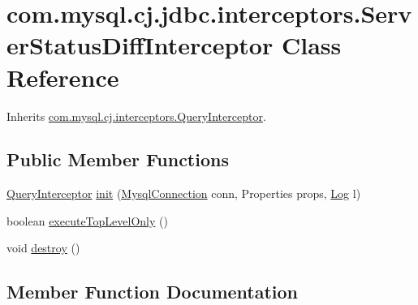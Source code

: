\hypertarget{classcom_1_1mysql_1_1cj_1_1jdbc_1_1interceptors_1_1_server_status_diff_interceptor}{}\section{com.\+mysql.\+cj.\+jdbc.\+interceptors.\+Server\+Status\+Diff\+Interceptor Class Reference}
\label{classcom_1_1mysql_1_1cj_1_1jdbc_1_1interceptors_1_1_server_status_diff_interceptor}


Inherits \mbox{\hyperlink{interfacecom_1_1mysql_1_1cj_1_1interceptors_1_1_query_interceptor}{com.\+mysql.\+cj.\+interceptors.\+Query\+Interceptor}}.

\subsection*{Public Member Functions}
\begin{DoxyCompactItemize}
\item 
\mbox{\hyperlink{interfacecom_1_1mysql_1_1cj_1_1interceptors_1_1_query_interceptor}{Query\+Interceptor}} \mbox{\hyperlink{classcom_1_1mysql_1_1cj_1_1jdbc_1_1interceptors_1_1_server_status_diff_interceptor_a918b0b784bd4d6edb689aa1cf01afb66}{init}} (\mbox{\hyperlink{interfacecom_1_1mysql_1_1cj_1_1_mysql_connection}{Mysql\+Connection}} conn, Properties props, \mbox{\hyperlink{interfacecom_1_1mysql_1_1cj_1_1log_1_1_log}{Log}} l)
\item 
boolean \mbox{\hyperlink{classcom_1_1mysql_1_1cj_1_1jdbc_1_1interceptors_1_1_server_status_diff_interceptor_a3234671cd5949383f563d60003d9798b}{execute\+Top\+Level\+Only}} ()
\item 
void \mbox{\hyperlink{classcom_1_1mysql_1_1cj_1_1jdbc_1_1interceptors_1_1_server_status_diff_interceptor_a119b87c009b04d7290f38b3e857a09d3}{destroy}} ()
\end{DoxyCompactItemize}


\subsection{Member Function Documentation}
\mbox{\label{classcom_1_1mysql_1_1cj_1_1jdbc_1_1interceptors_1_1_server_status_diff_interceptor_a119b87c009b04d7290f38b3e857a09d3}} 
